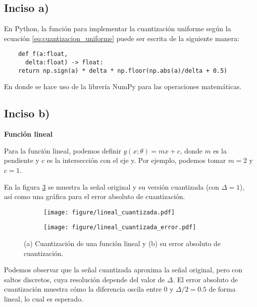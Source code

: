 \documentclass[paper=letter, fontsize=11pt, draft=false]{scrartcl}
\numberwithin{equation}{problemcounter} %
\numberwithin{figure}{problemcounter} %
\numberwithin{table}{problemcounter} %
\numberwithin{subsection}{problemcounter}
\begin{document}
\subsection{Inciso a)}
En Python, la función para implementar la cuantización uniforme según la ecuación \ref{eq:cuantizacion_uniforme} puede ser escrita de la siguiente manera:
\begin{verbatim}
    def f(a:float,
      delta:float) -> float:
    return np.sign(a) * delta * np.floor(np.abs(a)/delta + 0.5)
\end{verbatim}

En donde se hace uso de la librería NumPy para las operaciones matemáticas.


\subsection{Inciso b)}

\textbf{Función lineal}

Para la función lineal, podemos definir $g(x; \theta) = mx + c$, donde $m$ es la pendiente y $c$ es la intersección con el eje y. Por ejemplo, podemos tomar $m = 2$ y $c = 1$. 

En la figura \ref{fig:lineal} se muestra la señal original y su versión cuantizada (con $\Delta = 1$), así como una gráfica para el error absoluto de cuantización. 

\begin{figure}
    \centering
    \begin{subfigure}[b]{0.8\linewidth}
        \centering
        \texttt{[image: figure/lineal\_cuantizada.pdf]}
        \caption{}
        \label{fig:lineal_a}
    \end{subfigure}
    \vspace{0.5cm}
    \begin{subfigure}[b]{0.8\linewidth}
        \centering
        \texttt{[image: figure/lineal\_cuantizada\_error.pdf]}
        \caption{}
        \label{fig:lineal_b}
    \end{subfigure}
    \caption{(a) Cuantización de una función lineal y (b) su error absoluto de cuantización.}
    \label{fig:lineal}
\end{figure}

Podemos observar que la señal cuantizada aproxima la señal original, pero con saltos discretos, cuya resolución depende del valor de $\Delta$. El error absoluto de cuantización muestra cómo la diferencia oscila entre 0 y $\Delta/2 = 0.5$ de forma lineal, lo cual es esperado.
\end{document}
